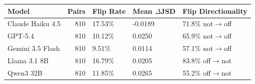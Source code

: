 \begin{tabular}{lrlll}
\toprule
Model & Pairs & Flip Rate & Mean $\Delta$JSD & Flip Directionality \\
\midrule
Claude Haiku 4.5 & 810 & 17.53\% & -0.0189 & 71.8\% not$\rightarrow$off \\
GPT-5.4 & 810 & 10.12\% & 0.0250 & 65.9\% not$\rightarrow$off \\
Gemini 3.5 Flash & 810 & 9.51\% & 0.0114 & 57.1\% not$\rightarrow$off \\
Llama 3.1 8B & 810 & 16.79\% & 0.0205 & 83.8\% off$\rightarrow$not \\
Qwen3 32B & 810 & 11.85\% & 0.0265 & 55.2\% off$\rightarrow$not \\
\bottomrule
\end{tabular}
